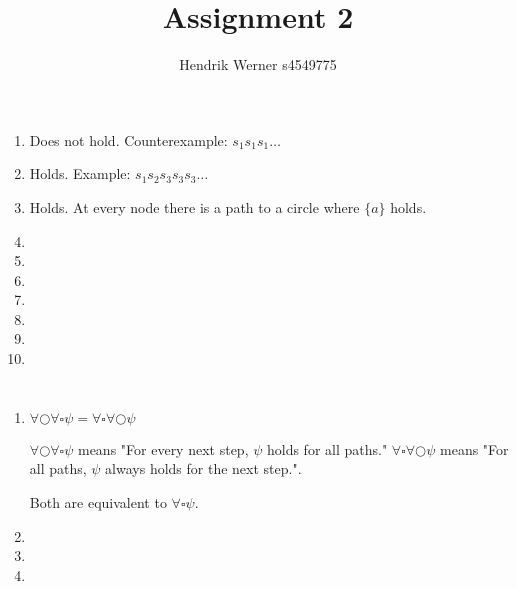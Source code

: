 \documentclass[12pt, a4paper]{article}
\title{Assignment 2}
\author{Hendrik Werner s4549775}
\begin{document}
\maketitle

\section{} %
\begin{enumerate}[a]
	\item %
	Does not hold. Counterexample: $s_1 s_1 s_1 \dots$
	\item %
	Holds. Example: $s_1 s_2 s_3 s_3 s_3 \dots$
	\item %
	Holds. At every node there is a path to a circle where $\{a\}$ holds.
	\item %
	\item %
	\item %
	\item %
	\item %
	\item %
	\item %
\end{enumerate}

\section{} %
\begin{enumerate}[a]
	\item %
	$\forall \bigcirc \forall \square \psi = \forall \square \forall \bigcirc \psi$

	$\forall \bigcirc \forall \square \psi$ means "For every next step, $\psi$ holds for all paths." $\forall \square \forall \bigcirc \psi$ means "For all paths, $\psi$ always holds for the next step.".

	Both are equivalent to $\forall \square \psi$.
	\item %
	\item %
	\item %
\end{enumerate}
\end{document}
